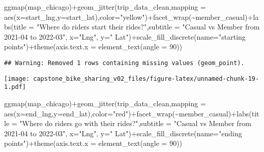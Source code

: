 \documentclass[
]{article}
\newenvironment{Shaded}{\begin{snugshade}}{\end{snugshade}}
\newcommand{\AttributeTok}[1]{\textcolor[rgb]{0.77,0.63,0.00}{#1}}
\newcommand{\DecValTok}[1]{\textcolor[rgb]{0.00,0.00,0.81}{#1}}
\newcommand{\FunctionTok}[1]{\textcolor[rgb]{0.00,0.00,0.00}{#1}}
\newcommand{\NormalTok}[1]{#1}
\newcommand{\SpecialCharTok}[1]{\textcolor[rgb]{0.00,0.00,0.00}{#1}}
\newcommand{\StringTok}[1]{\textcolor[rgb]{0.31,0.60,0.02}{#1}}
\begin{document}
\begin{Shaded}
\begin{Highlighting}[]
\FunctionTok{ggmap}\NormalTok{(map\_chicago)}\SpecialCharTok{+}\FunctionTok{geom\_jitter}\NormalTok{(trip\_data\_clean,}\AttributeTok{mapping =} \FunctionTok{aes}\NormalTok{(}\AttributeTok{x=}\NormalTok{start\_lng,}\AttributeTok{y=}\NormalTok{start\_lat),}\AttributeTok{color=}\StringTok{"yellow"}\NormalTok{)}\SpecialCharTok{+}\FunctionTok{facet\_wrap}\NormalTok{(}\SpecialCharTok{\textasciitilde{}}\NormalTok{member\_casual)}\SpecialCharTok{+}\FunctionTok{labs}\NormalTok{(}\AttributeTok{title =} \StringTok{"Where do riders start their rides?"}\NormalTok{,}\AttributeTok{subtitle =} \StringTok{"Casual vs Member from 2021{-}04 to 2022{-}03"}\NormalTok{, }\AttributeTok{x=}\StringTok{"Lng"}\NormalTok{, }\AttributeTok{y=}\StringTok{" Lat"}\NormalTok{)}\SpecialCharTok{+}\FunctionTok{scale\_fill\_discrete}\NormalTok{(}\AttributeTok{name=}\StringTok{"starting points"}\NormalTok{)}\SpecialCharTok{+}\FunctionTok{theme}\NormalTok{(}\AttributeTok{axis.text.x =} \FunctionTok{element\_text}\NormalTok{(}\AttributeTok{angle =} \DecValTok{90}\NormalTok{))}
\end{Highlighting}
\end{Shaded}

\begin{verbatim}
## Warning: Removed 1 rows containing missing values (geom_point).
\end{verbatim}

\texttt{[image: capstone\_bike\_sharing\_v02\_files/figure-latex/unnamed-chunk-19-1.pdf]}

\begin{Shaded}
\begin{Highlighting}[]
\FunctionTok{ggmap}\NormalTok{(map\_chicago)}\SpecialCharTok{+}\FunctionTok{geom\_jitter}\NormalTok{(trip\_data\_clean,}\AttributeTok{mapping =} \FunctionTok{aes}\NormalTok{(}\AttributeTok{x=}\NormalTok{end\_lng,}\AttributeTok{y=}\NormalTok{end\_lat),}\AttributeTok{color=}\StringTok{"red"}\NormalTok{)}\SpecialCharTok{+}\FunctionTok{facet\_wrap}\NormalTok{(}\SpecialCharTok{\textasciitilde{}}\NormalTok{member\_casual)}\SpecialCharTok{+}\FunctionTok{labs}\NormalTok{(}\AttributeTok{title =} \StringTok{"Where do riders go with their rides?"}\NormalTok{,}\AttributeTok{subtitle =} \StringTok{"Casual vs Member from 2021{-}04 to 2022{-}03"}\NormalTok{, }\AttributeTok{x=}\StringTok{"Lng"}\NormalTok{, }\AttributeTok{y=}\StringTok{" Lat"}\NormalTok{)}\SpecialCharTok{+}\FunctionTok{scale\_fill\_discrete}\NormalTok{(}\AttributeTok{name=}\StringTok{"ending points"}\NormalTok{)}\SpecialCharTok{+}\FunctionTok{theme}\NormalTok{(}\AttributeTok{axis.text.x =} \FunctionTok{element\_text}\NormalTok{(}\AttributeTok{angle =} \DecValTok{90}\NormalTok{))}
\end{Highlighting}
\end{Shaded}
\end{document}
